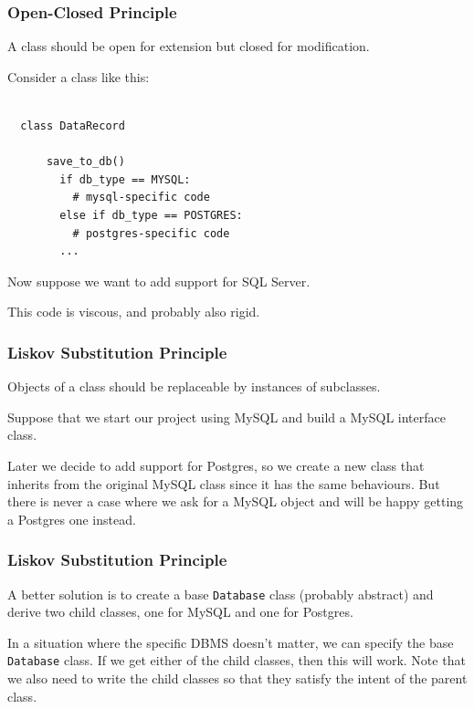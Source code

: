 \documentclass[10pt]{beamer}
\begin{document}
\begin{frame}[fragile]
  \frametitle{Open-Closed Principle}
  
  A class should be open for extension but closed for modification.
  
  Consider a class like this:
  
  \begin{verbatim}
  
  class DataRecord  
  
      save_to_db()
        if db_type == MYSQL:
          # mysql-specific code
        else if db_type == POSTGRES:
          # postgres-specific code
        ...  
   \end{verbatim}
   
   Now suppose we want to add support for SQL Server.
   
   This code is viscous, and probably also rigid.         
  
\end{frame}  

\begin{frame}
  \frametitle{Liskov Substitution Principle}
  
  Objects of a class should be replaceable by instances of subclasses.
  
  Suppose that we start our project using MySQL and build a MySQL interface class.
  
  \vspace{5mm}
  Later we decide to add support for Postgres, so we create a new class that inherits from 
  the original MySQL class since it has the same behaviours.  But there is never a case 
  where we ask for a MySQL object and will be happy getting a Postgres one instead.
  \end{frame} 
  
\begin{frame}
  \frametitle{Liskov Substitution Principle}
  
  A better solution is to create a base \texttt{Database} class (probably abstract) and derive
  two child classes, one for MySQL and one for Postgres. 
  
  \vspace{5mm}
  In a situation where the specific DBMS doesn't matter, we can specify the base \texttt{Database}
  class. If we get either of the child classes, then this will work. Note that we also need to write the 
  child classes so that they satisfy the intent of the parent class.
  \end{frame} 
\end{document}
